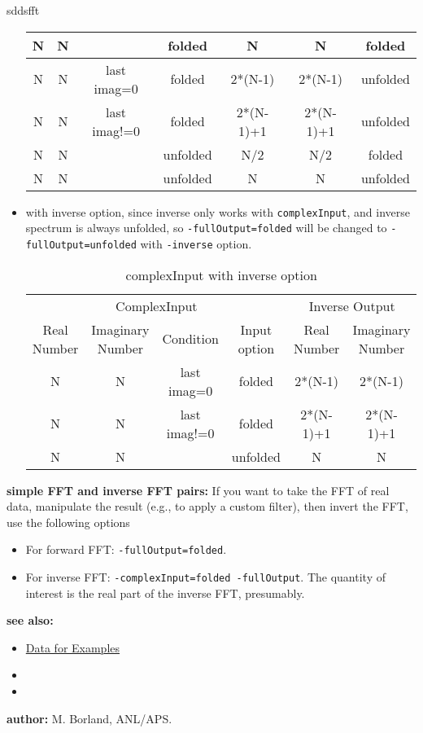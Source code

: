 \begin{sddsprog}{sddsfft}
\begin{itemize}
\begin{table}[hbt]
\begin{tabular}{|c|c|c|c|c|c|c|}
            N & N & & folded & N & N & folded \\ \hline
            N & N & last imag=0 & folded & 2*(N-1) & 2*(N-1) & unfolded \\ \hline
            N & N & last imag!=0 & folded & 2*(N-1)+1 & 2*(N-1)+1 & unfolded \\ \hline
            N & N & & unfolded & N/2 & N/2 & folded \\ \hline
            N & N & & unfolded & N & N & unfolded \\ \hline
          \end{tabular}
          \label{table2}
        \end{table}
      \item with inverse option, since inverse only works with \verb|complexInput|, and inverse spectrum is always unfolded, so \verb|-fullOutput=folded| will be changed to \verb|-fullOutput=unfolded| with \verb|-inverse| option.
        \begin{table}[hbt]
          \caption{complexInput with inverse option}
          \begin{tabular}{|c|c|c|c|c|c|}
            \multicolumn{4}{|c|}{ComplexInput} & \multicolumn{2}{|c|}{Inverse Output} \\
            Real Number & Imaginary Number & Condition & Input option & Real Number & Imaginary Number \\ \hline
            N & N & last imag=0 & folded & 2*(N-1) & 2*(N-1) \\ \hline
            N & N & last imag!=0 & folded & 2*(N-1)+1 & 2*(N-1)+1 \\ \hline
            N & N & & unfolded & N & N \\ \hline
          \end{tabular}
          \label{table3}
        \end{table}
    \end{itemize}
  \item \textbf{simple FFT and inverse FFT pairs:} If you want to take the FFT of real data, manipulate the result (e.g., to apply a custom filter), then invert the FFT, use the following options
    \begin{itemize}
      \item For forward FFT: \verb|-fullOutput=folded|.
      \item For inverse FFT: \verb|-complexInput=folded -fullOutput|. The quantity of interest is the real part of the inverse FFT, presumably.
    \end{itemize}
  \item \textbf{see also:}
    \begin{itemize}
      \item \hyperref[exampleData]{Data for Examples}
      \item {}
      \item {}
    \end{itemize}
  \item \textbf{author:} M. Borland, ANL/APS.
\end{sddsprog}

